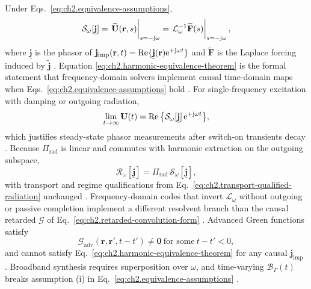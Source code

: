 Under Eqs.~\eqref{eq:ch2.equivalence-assumptions},
\begin{equation}
\label{eq:ch2.harmonic-equivalence-theorem}
\mathcal{S}_\omega[\underline{\mathbf{j}}]
=
\eval{\widetilde{\mathbf{U}}(\mathbf{r},s)}_{s=-\jj\omega}
=
\eval{\mathcal{L}_\omega^{-1}\widetilde{\mathbf{F}}(s)}_{s=-\jj\omega},
\end{equation}
where \(\underline{\mathbf{j}}\) is the phasor of
\(\mathbf{j}_{\mathrm{imp}}(\mathbf{r},t)=\Re\{\underline{\mathbf{j}}(\mathbf{r})\mathrm{e}^{+\mathrm{j}\omega t}\}\)
and \(\widetilde{\mathbf{F}}\) is the Laplace forcing induced by
\(\widetilde{\mathbf{j}}\) \cite{stratton1941}. Equation
\eqref{eq:ch2.harmonic-equivalence-theorem} is the formal statement that
frequency-domain solvers implement causal time-domain maps when
Eqs.~\eqref{eq:ch2.equivalence-assumptions} hold \cite{harrington2001}. For
single-frequency excitation with damping or outgoing radiation,
\begin{equation}
\label{eq:ch2.steady-state-harmonic-limit}
\lim_{t\to\infty}\mathbf{U}(t)
=
\Re\big\{\mathcal{S}_\omega[\underline{\mathbf{j}}]\,\mathrm{e}^{+\mathrm{j}\omega t}\big\},
\end{equation}
which justifies steady-state phasor measurements after switch-on transients decay
\cite{stratton1941}. Because $\Pi_{\mathrm{rad}}$ is linear and commutes with harmonic
extraction on the outgoing subspace,
\begin{equation}
\label{eq:ch2.radiation-time-frequency-equiv}
\mathcal{R}_\omega[\underline{\mathbf{j}}]
=
\Pi_{\mathrm{rad}}\,\mathcal{S}_\omega[\underline{\mathbf{j}}],
\end{equation}
with transport and regime qualifications from
Eq.~\eqref{eq:ch2.transport-qualified-radiation} unchanged
\cite{stratton1941}. Frequency-domain codes that invert $\mathcal{L}_\omega$ without
outgoing or passive completion implement a different resolvent branch than the causal
retarded $\mathcal{G}$ of Eq.~\eqref{eq:ch2.retarded-convolution-form}
\cite{harrington2001}. Advanced Green functions satisfy
\begin{equation}
\label{eq:ch2.advanced-kernel-violation}
\mathcal{G}_{\mathrm{adv}}(\mathbf{r},\mathbf{r}',t-t')\neq\mathbf{0}
\ \text{for some}\ t-t'<0,
\end{equation}
and cannot satisfy Eq.~\eqref{eq:ch2.harmonic-equivalence-theorem} for any causal
$\mathbf{j}_{\mathrm{imp}}$ \cite{stratton1941}. Broadband synthesis requires
superposition over $\omega$, and time-varying $\mathcal{B}_\Gamma(t)$ breaks assumption
(i) in Eq.~\eqref{eq:ch2.equivalence-assumptions} \cite{stratton1941}.
